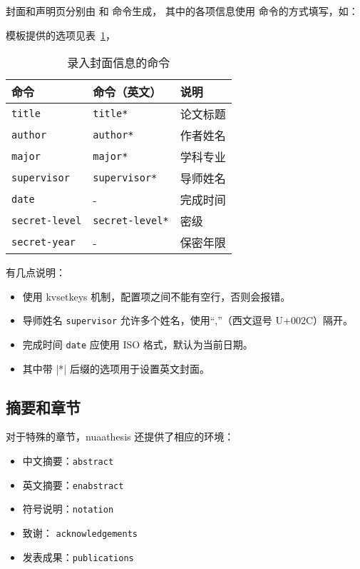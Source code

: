 \documentclass[a4paper]{ltxdoc}
\DeclareRobustCommand\env{\texttt}
\DeclareRobustCommand\pkg{\textsf}
\DeclareRobustCommand\cls{\textsf}
\DeclareRobustCommand\opt{\texttt}
\begin{document}
\DescribeMacro{\maketitle}
\DescribeMacro{\copyrightpage}
封面和声明页分别由  和  命令生成，
其中的各项信息使用  命令的方式填写，如：
\begin{latex}
\end{latex}
模板提供的选项见表~\ref{tab:covercmds}，
\begin{table}[htb]
    \centering\small
    \caption{录入封面信息的命令}
    \label{tab:covercmds}
    \begin{tabular}{lll}
        \toprule
        命令               & 命令（英文）        & 说明     \\
        \midrule
        \opt{title}        & \opt{title*}        & 论文标题 \\
        \opt{author}       & \opt{author*}       & 作者姓名 \\
        \opt{major}        & \opt{major*}        & 学科专业 \\
        \opt{supervisor}   & \opt{supervisor*}   & 导师姓名 \\
        \opt{date}         & -                   & 完成时间 \\
        \opt{secret-level} & \opt{secret-level*} & 密级     \\
        \opt{secret-year}  & -                   & 保密年限 \\
        \bottomrule
    \end{tabular}
\end{table}

有几点说明：
\begin{itemize}
    \item {} 使用 \pkg{kvsetkeys} 机制，配置项之间不能有空行，否则会报错。
    \item 导师姓名 \opt{supervisor} 允许多个姓名，使用“,”（西文逗号 U+002C）隔开。
    \item 完成时间 \opt{date} 应使用 ISO 格式，默认为当前日期。
    \item 其中带 |*| 后缀的选项用于设置英文封面。
\end{itemize}


\subsection{摘要和章节}
对于特殊的章节，\cls{nuaathesis} 还提供了相应的环境：
\begin{itemize}
    \item 中文摘要：\env{abstract}
    \item 英文摘要：\env{enabstract}
    \item 符号说明：\env{notation}
    \item 致谢：    \env{acknowledgements}
    \item 发表成果：\env{publications}
\end{itemize}
\end{document}

